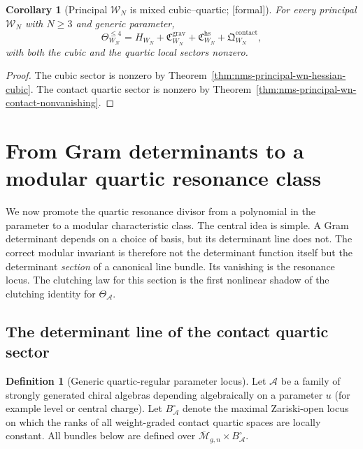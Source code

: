 \documentclass[11pt,oneside]{memoir}
\numberwithin{equation}{chapter}
\newtheorem{corollary}[theorem]{Corollary}
\theoremstyle{definition}
\newtheorem{definition}[theorem]{Definition}
\newcommand{\ClaimStatusProvedHere}{\textnormal{[formal]}}
\newcommand{\cA}{\mathcal A}
\begin{document}
\begin{corollary}[Principal \texorpdfstring{$\mathcal W_N$}{WN} is mixed cubic--quartic; \ClaimStatusProvedHere]
\label{cor:nms-principal-wn-mixed}
For every principal $\mathcal W_N$ with $N\ge 3$ and generic parameter,
\[
\Theta_{W_N}^{\le 4}
=
H_{W_N}+\mathfrak C^{\mathrm{grav}}_{W_N}+\mathfrak C^{\mathrm{hs}}_{W_N}+\mathfrak Q^{\mathrm{contact}}_{W_N},
\]
with both the cubic and the quartic local sectors nonzero.
\end{corollary}

\begin{proof}
The cubic sector is nonzero by Theorem~\ref{thm:nms-principal-wn-hessian-cubic}.  The contact quartic sector is nonzero by Theorem~\ref{thm:nms-principal-wn-contact-nonvanishing}.\qedhere
\end{proof}

\section{From Gram determinants to a modular quartic resonance class}
\label{sec:nms-modular-resonance-class}

We now promote the quartic resonance divisor from a polynomial in the parameter to a modular characteristic class.  The central idea is simple.  A Gram determinant depends on a choice of basis, but its determinant line does not.  The correct modular invariant is therefore not the determinant function itself but the determinant \emph{section} of a canonical line bundle.  Its vanishing is the resonance locus.  The clutching law for this section is the first nonlinear shadow of the clutching identity for $\Theta_{\cA}$.

\subsection{The determinant line of the contact quartic sector}
\label{subsec:nms-determinant-line}

\begin{definition}[Generic quartic-regular parameter locus]
\label{def:nms-generic-parameter-locus}
Let $\cA$ be a family of strongly generated chiral algebras depending algebraically on a parameter $u$ (for example level or central charge).  Let $B_{\cA}^{\circ}$ denote the maximal Zariski-open locus on which the ranks of all weight-graded contact quartic spaces are locally constant.  All bundles below are defined over $\overline{\mathcal M}_{g,n}\times B_{\cA}^{\circ}$.
\end{definition}
\end{document}
